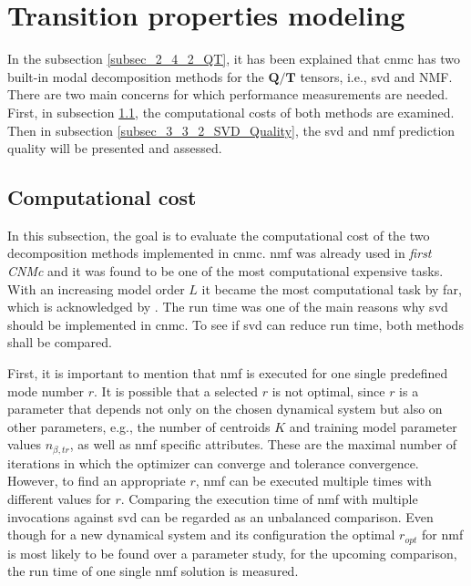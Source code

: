 \section{Transition properties modeling}
\label{sec_3_3_SVD_NMF}
In the subsection \ref{subsec_2_4_2_QT}, it has been explained that \gls{cnmc} has two built-in modal decomposition methods for the $\bm Q / \bm T$ tensors, i.e., \gls{svd} and NMF.
There are two main concerns for which performance measurements are needed.
First, in subsection \ref{subsec_3_3_1_SVD_Speed}, the computational costs of both methods are examined.
Then in subsection \ref{subsec_3_3_2_SVD_Quality}, the \gls{svd} and \gls{nmf} prediction quality will be presented and assessed.

\subsection{Computational cost}
\label{subsec_3_3_1_SVD_Speed}
In this subsection, the goal is to evaluate the computational cost of the two decomposition methods implemented in \gls{cnmc}.
\gls{nmf} was already used in \emph{first CNMc} and it was found to be one of the most computational expensive tasks.
With an increasing model order $L$ it became the most computational task by far, which is acknowledged by \cite{Max2021}. 
The run time was one of the main reasons why \gls{svd} should be implemented in \gls{cnmc}. 
To see if \gls{svd} can reduce run time, both methods shall be compared.\newline 

First, it is important to mention that \gls{nmf} is executed for one single predefined mode number $r$. 
It is possible that a selected $r$ is not optimal, since $r$ is a parameter that depends not only on the chosen dynamical system but also on other parameters, e.g., the number of centroids $K$ and training model parameter values $n_{\beta, tr}$, as well as \gls{nmf} specific attributes. 
These are the maximal number of iterations in which the optimizer can converge and tolerance convergence.
However, to find an appropriate $r$, \gls{nmf} can be executed multiple times with different values for $r$.
Comparing the execution time of \gls{nmf} with multiple invocations against \gls{svd} can be regarded as an unbalanced comparison.
Even though for a new dynamical system and its configuration the optimal $r_{opt}$ for \gls{nmf} is most likely to be found over a parameter study, for the upcoming comparison, the run time of one single \gls{nmf} solution is measured.\newline 

